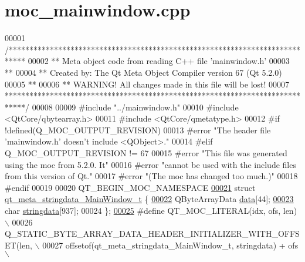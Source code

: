 \hypertarget{a00015_source}{\section{moc\+\_\+mainwindow.\+cpp}
\label{a00015_source}
}

\begin{DoxyCode}
00001 \textcolor{comment}{/****************************************************************************}
00002 \textcolor{comment}{** Meta object code from reading C++ file 'mainwindow.h'}
00003 \textcolor{comment}{**}
00004 \textcolor{comment}{** Created by: The Qt Meta Object Compiler version 67 (Qt 5.2.0)}
00005 \textcolor{comment}{**}
00006 \textcolor{comment}{** WARNING! All changes made in this file will be lost!}
00007 \textcolor{comment}{*****************************************************************************/}
00008 
00009 \textcolor{preprocessor}{#include "../mainwindow.h"}
00010 \textcolor{preprocessor}{#include <QtCore/qbytearray.h>}
00011 \textcolor{preprocessor}{#include <QtCore/qmetatype.h>}
00012 \textcolor{preprocessor}{#if !defined(Q\_MOC\_OUTPUT\_REVISION)}
00013 \textcolor{preprocessor}{#error "The header file 'mainwindow.h' doesn't include <QObject>."}
00014 \textcolor{preprocessor}{#elif Q\_MOC\_OUTPUT\_REVISION != 67}
00015 \textcolor{preprocessor}{#error "This file was generated using the moc from 5.2.0. It"}
00016 \textcolor{preprocessor}{#error "cannot be used with the include files from this version of Qt."}
00017 \textcolor{preprocessor}{#error "(The moc has changed too much.)"}
00018 \textcolor{preprocessor}{#endif}
00019 
00020 QT\_BEGIN\_MOC\_NAMESPACE
\hypertarget{a00015_source_l00021}{}\hyperlink{a00015}{00021} \textcolor{keyword}{struct }\hyperlink{a00015_d9/df8/a00096}{qt\_meta\_stringdata\_MainWindow\_t} \{
\hypertarget{a00015_source_l00022}{}\hyperlink{a00015_a3d0c7851e40263cf43b0979ebc8eed83}{00022}     QByteArrayData \hyperlink{a00015_a3d0c7851e40263cf43b0979ebc8eed83}{data}[44];
\hypertarget{a00015_source_l00023}{}\hyperlink{a00015_aa581d4bebf76b40e9469596766315411}{00023}     \textcolor{keywordtype}{char} \hyperlink{a00015_aa581d4bebf76b40e9469596766315411}{stringdata}[937];
00024 \};
\hypertarget{a00015_source_l00025}{}\hyperlink{a00015_a75bb9482d242cde0a06c9dbdc6b83abe}{00025} \textcolor{preprocessor}{#define QT\_MOC\_LITERAL(idx, ofs, len) \(\backslash\)}
00026 \textcolor{preprocessor}{    Q\_STATIC\_BYTE\_ARRAY\_DATA\_HEADER\_INITIALIZER\_WITH\_OFFSET(len, \(\backslash\)}
00027 \textcolor{preprocessor}{    offsetof(qt\_meta\_stringdata\_MainWindow\_t, stringdata) + ofs \(\backslash\)}

\end{DoxyCode}
